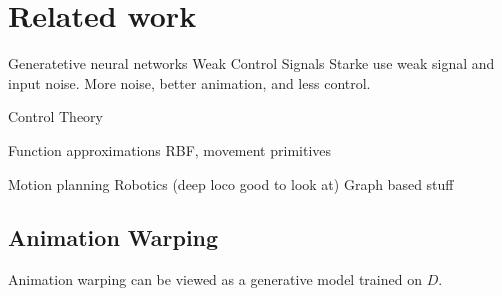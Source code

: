 \section{Related work}

Generatetive neural networks Weak Control Signals
    Starke use weak signal and input noise. More noise, better animation, and less control.


Control Theory

Function approximations 
    RBF, movement primitives

Motion planning
    Robotics (deep loco good to look at)
    Graph based stuff



\subsection{Animation Warping}
Animation warping can be viewed as a generative model trained on $D$. 


